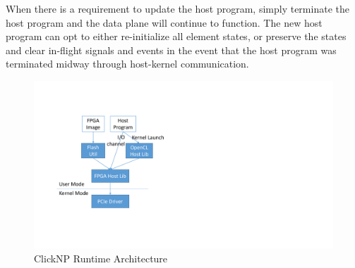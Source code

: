 When there is a requirement to update the host program, simply terminate the host program and the data plane will continue to function. The new host program can opt to either re-initialize all element states, or preserve the states and clear in-flight signals and events in the event that the host program was terminated midway through host-kernel communication.

\begin{figure}[!t]
	\centering
	\includegraphics[width=0.8\columnwidth]{image/CatapultRuntime}
	\vspace{-0.15in}
	\caption{ClickNP Runtime Architecture}
	\vspace{-0.15in}
	\label{clicknp:fig:CatapultFPGAArch}
\end{figure}
\fi
